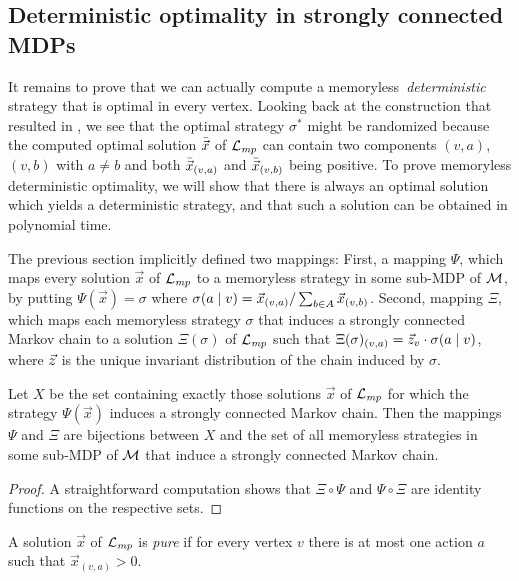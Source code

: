 \subsection*{Deterministic optimality in strongly connected MDPs}

It remains to prove that we can actually compute a memoryless~\emph{deterministic} strategy that is optimal in every vertex. Looking back at the construction that resulted in , we see that the optimal strategy $\sigma^*$ might be randomized because the computed optimal solution $\bar{\vec{x}}$ of $\mathcal{L}_{\mathit{mp}}$ can contain two components $(v,a)$, $(v,b)$ with $a\neq b$ and both $\bar{\vec{x}}_{(v,a)}$ and $\bar{\vec{x}}_{(v,b)}$ being positive. To prove memoryless deterministic optimality, we will show that there is always an optimal solution which yields a deterministic strategy, and that such a solution can be obtained in polynomial time.

The previous section implicitly defined two mappings: First, a mapping $\Psi$, which maps every solution $ \vec{x} $ of $\mathcal{L}_{\mathit{mp}}$ to a memoryless strategy in some sub-MDP of $\mathcal{M}$, by putting $\Psi(\vec{x}) = \sigma$ where $\sigma(a\mid v) = \vec{x}_{(v,a)}/\sum_{b\in A}\vec{x}_{(v,b)}$. Second, mapping $\Xi$, which maps each memoryless strategy $\sigma$ that induces a strongly connected Markov chain to a solution $\Xi(\sigma)$ of $\mathcal{L}_{\mathit{mp}}$ such that $\Xi(\sigma)_{(v,a)}=\vec{z}_v\cdot \sigma(a\mid v)$, where $\vec{z}$ is the unique invariant distribution of the chain induced by $\sigma$.
\begin{lemma}
\label{5-lem:sol-strat-correspondence}
Let $X$ be the set containing exactly those solutions $\vec{x}$ of $\mathcal{L}_{\mathit{mp}}$ for which the strategy  $\Psi(\vec{x})$ induces a strongly connected Markov chain. Then the mappings $\Psi$ and $\Xi$ are bijections between $X$ and the set of all memoryless strategies in some sub-MDP of $\mathcal{M}$ that induce a strongly connected Markov chain.
\end{lemma}
\begin{proof}
A straightforward computation shows that $\Xi\circ\Psi$ and $\Psi\circ\Xi$ are identity functions on the respective sets.
\end{proof}

\begin{definition}
	\label{5-def:pure-lp}
A solution $\vec{x}$ of $\mathcal{L}_{\mathit{mp}}$	is \emph{pure} if for every vertex $v$ there is at most one action $a$ such that $\vec{x}_{(v,a)}>0$.
\end{definition}

